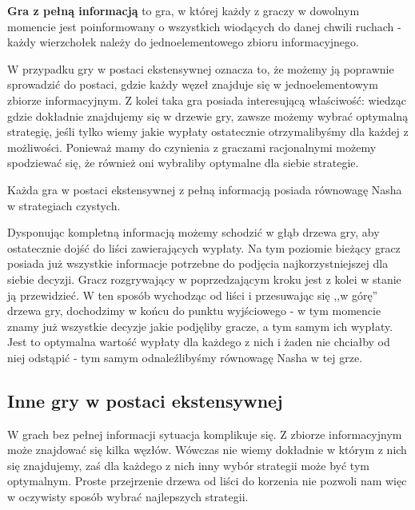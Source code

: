 \documentclass[polish]{standalone}
\begin{document}
\begin{definition}
\textbf{Gra z pełną informacją} to gra, w której każdy z graczy w dowolnym
momencie jest poinformowany o wszystkich wiodących do danej chwili ruchach - każdy wierzchołek należy do
jednoelementowego zbioru informacyjnego.
\cite[str.~81]{FT-GT}
\end{definition}

W przypadku gry w postaci ekstensywnej oznacza to, że możemy ją poprawnie sprowadzić do postaci, gdzie każdy węzeł
znajduje się w jednoelementowym zbiorze informacyjnym. Z kolei taka gra posiada interesującą właściwość: wiedząc gdzie
dokładnie znajdujemy się w drzewie gry, zawsze możemy wybrać optymalną strategię, jeśli tylko wiemy jakie wypłaty
ostatecznie otrzymalibyśmy dla każdej z możliwości. Ponieważ mamy do czynienia z graczami racjonalnymi możemy spodziewać
się, że również oni wybraliby optymalne dla siebie strategie.

\begin{theorem}
Każda gra w postaci ekstensywnej z pełną informacją posiada równowagę Nasha w strategiach czystych.
\cite[str.~91]{FT-GT}
\end{theorem}

Dysponując kompletną informacją możemy schodzić w głąb drzewa gry, aby ostatecznie dojść do liści zawierających wypłaty.
Na tym poziomie bieżący gracz posiada już wszystkie informacje potrzebne do podjęcia najkorzystniejszej dla siebie
decyzji. Gracz rozgrywający w poprzedzającym kroku jest z kolei w stanie ją przewidzieć. W ten sposób wychodząc od liści
i przesuwając się ,,w górę'' drzewa gry, dochodzimy w końcu do punktu wyjściowego - w tym momencie znamy już wszystkie
decyzje jakie podjęliby gracze, a tym samym ich wypłaty. Jest to optymalna wartość wypłaty dla każdego z nich i żaden
nie chciałby od niej odstąpić - tym samym odnaleźlibyśmy równowagę Nasha w tej grze.

\subsection{Inne gry w postaci ekstensywnej}

W grach bez pełnej informacji sytuacja komplikuje się. Z zbiorze informacyjnym może znajdować się kilka węzłów.
Wówczas nie wiemy dokładnie w którym z nich się znajdujemy, zaś dla każdego z nich inny wybór strategii może być tym
optymalnym. Proste przejrzenie drzewa od liści do korzenia nie pozwoli nam więc w oczywisty sposób wybrać najlepszych
strategii.
\end{document}
